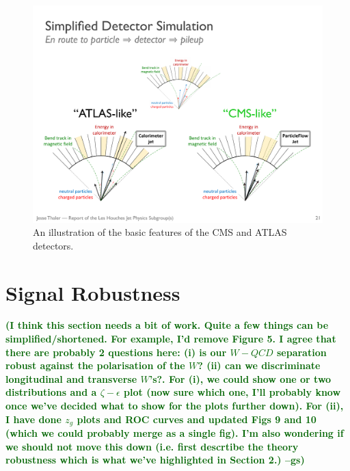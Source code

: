 \documentclass[11pt,letterpaper]{article}
\newcommand{\gs}[1]{\textbf{\textcolor{darkgreen}{(#1 --gs)}}}
\begin{document}
\begin{figure}
\begin{center}
\includegraphics[width=1.0\columnwidth]{figures/CMS_vs_ATLAS_detector}
\end{center}
\caption{An illustration of the basic features of the CMS and ATLAS detectors.}
\end{figure}




\section{Signal Robustness}\label{sec:polar}

\gs{I think this section needs a bit of work. Quite a few things can
  be simplified/shortened. For example, I'd remove Figure 5. I agree
  that there are probably 2 questions here: (i) is our $W-QCD$
  separation robust against the polarisation of the $W$? (ii) can we
  discriminate longitudinal and transverse $W$'s?. For (i), we could
  show one or two distributions and a $\zeta-\epsilon$ plot (now sure
  which one, I'll probably know once we've decided what to show for
  the plots further down). For (ii), I have done $z_g$ plots and ROC
  curves and updated Figs 9 and 10 (which we could probably merge as a
  single fig). I'm also wondering if we should not move this down
  (i.e. first descrtibe the theory robustness which is what we've
  highlighted in Section 2.)}
\end{document}
